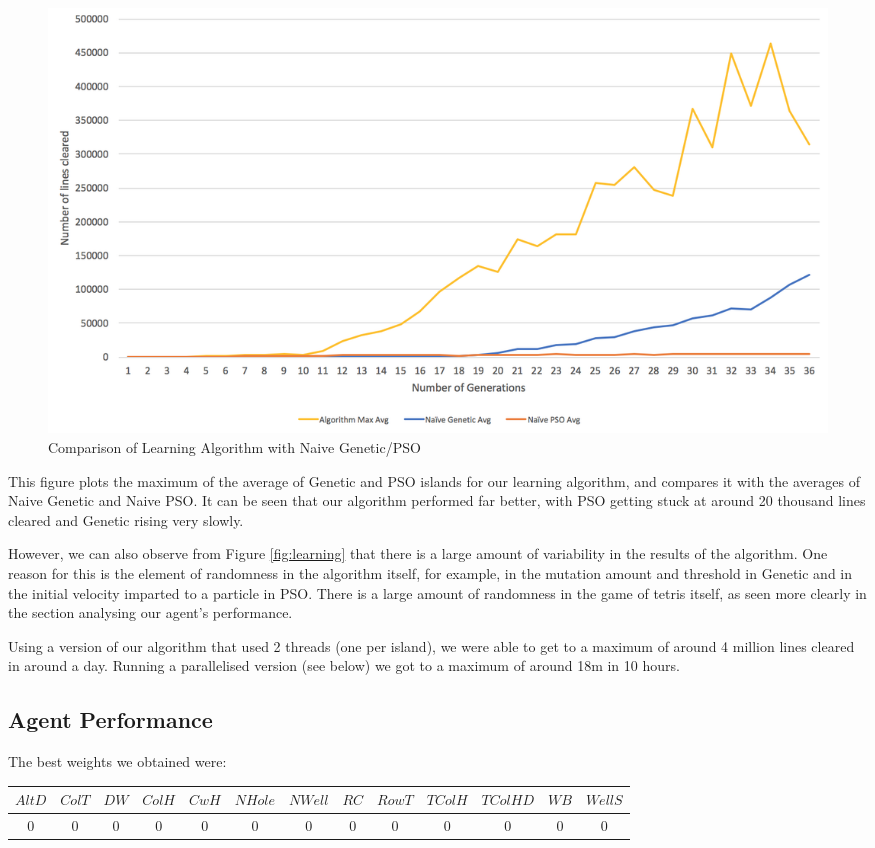 \documentclass{article}
\begin{document}
\begin{figure}[h]
	\includegraphics[scale=0.4]{learning/Naive}
	\centering
	\caption{Comparison of Learning Algorithm with Naive Genetic/PSO}
	\label{fig:naive}
\end{figure}

This figure plots the maximum of the average of Genetic and PSO islands for our
learning algorithm, and compares it with the averages of Naive Genetic and
Naive PSO. It can be seen that our algorithm performed far better, with PSO
getting stuck at around 20 thousand lines cleared and Genetic rising very
slowly.

However, we can also observe from Figure \ref{fig:learning} that there is a
large amount of variability in the results of the algorithm. One reason for
this is the element of randomness in the algorithm itself, for example, in the
mutation amount and threshold in Genetic and in the initial velocity imparted
to a particle in PSO. There is a large amount of randomness in the game of
tetris itself, as seen more clearly in the section analysing our agent's
performance.

Using a version of our algorithm that used 2 threads (one per island), we were
able to get to a maximum of around 4 million lines cleared in around a day.
Running a parallelised version (see below) we got to a maximum of around 18m in
10 hours.

\subsection{Agent Performance}
The best weights we obtained were:

\begin{center}
\begin{tabular}{ | c | c | c | c | c | c | c | c | c | c | c | c | c | }
	\hline
	$AltD$ & $ColT$ & $DW$ & $ColH$ & $CwH$ & $NHole$ & $NWell$ & $RC$ & $RowT$ & $TColH$ & $TColHD$ & $WB$ & $WellS$ \\ \hline
	0 & 0 & 0 & 0 & 0 & 0 & 0 & 0 & 0 & 0 & 0 & 0 & 0 \\ \hline
\end{tabular}
\end{center}
\end{document}
